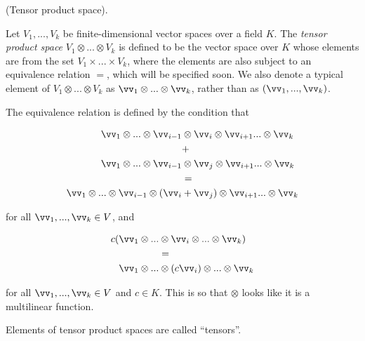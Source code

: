 \begin{defn}
\label{ch::motivated_intro::defn::tensor_product_space}
     (Tensor product space).
    
    Let $V_1, ..., V_k$ be finite-dimensional vector spaces over a field $K$. The \textit{tensor product space} $V_1 \otimes ... \otimes V_k$ is defined to be the vector space over $K$ whose elements are from the set $V_1 \times ... \times V_k$, where the elements are also subject to an equivalence relation $=$, which will be specified soon. We also denote a typical element of $V_1 \otimes ... \otimes V_k$ as $\vv_1 \otimes ... \otimes \vv_k$, rather than as $(\vv_1, ..., \vv_k)$. 
    
    The equivalence relation is defined by the condition that
    
    \begin{align*}
        \vv_1 \otimes ... \otimes \vv_{i - 1} &\otimes \vv_{i} \otimes \vv_{i + 1} ... \otimes \vv_k \\
        &+ \\
        \vv_1 \otimes ... \otimes \vv_{i - 1} &\otimes \vv_{j} \otimes \vv_{i + 1} ... \otimes \vv_k \\
        &= \\
        \vv_1 \otimes ... \otimes \vv_{i - 1} \otimes (\vv_{i} &+ \vv_{j}) \otimes \vv_{i + 1} ... \otimes \vv_k
    \end{align*}

    for all $\vv_1, ..., \vv_k \in V$, and
    
    \begin{align*}
        c (\vv_1 \otimes ... &\otimes \vv_i \otimes ... \otimes \vv_k ) \\
        &= \\
        \vv_1 \otimes ... &\otimes (c \vv_i) \otimes ... \otimes \vv_k
    \end{align*}

    for all $\vv_1, ..., \vv_k \in V$ and $c \in K$. This is so that $\otimes$ looks like it is a multilinear function.
    
    Elements of tensor product spaces are called ``tensors''.
\end{defn}

    

